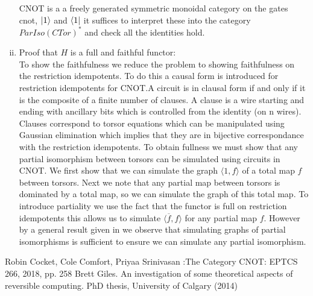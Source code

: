 \documentclass[11pt, oneside]{amsart}
\theoremstyle{definition}
\theoremstyle{definition}
\begin{document}
\begin{enumerate}[(i)]
\begin{figure}
         \label{fig:my_label}
     \end{figure}
     CNOT is a a freely generated symmetric monoidal category on the gates cnot, $\ket{1}$ and $\bra{1}$ it suffices to interpret these into the category $ParIso(CTor)^{*}$ and check all the identities hold.
     \item Proof that $H$ is a full and faithful functor:\\
     To show the faithfulness we reduce the problem to showing faithfulness on the restriction idempotents. To do this a causal form is introduced for restriction idempotents for CNOT.A circuit is in clausal form if and only if it is the composite of a finite
     number of clauses. A clause is a wire starting and ending with ancillary bits which is controlled
     from the identity (on n wires). Clauses correspond to torsor equations which can be manipulated using Gaussian elimination which implies that they are in bijective correspondance with the restriction idempotents. To obtain fullness we must show that any partial isomorphism between torsors can be simulated using circuits in CNOT. We first show that we can simulate the graph $\langle{1, f}\rangle$ of a total map $f$ between torsors. Next we note that any partial map between torsors is dominated by a total map, so we can simulate the graph of this total map. To introduce partiality we use the fact that the functor is full on restriction idempotents this allows us to simulate $\langle{\overline{f}, f}\rangle$ for any partial map $f$. However by a general result given in \cite{robin} we observe that simulating graphs of partial isomorphisms is sufficient to ensure we can simulate any partial isomorphism.
 \end{enumerate}
 

\begin{thebibliography}{10}
Robin Cocket, Cole Comfort, Priyaa Srinivasan :The Category CNOT: EPTCS 266, 2018, pp. 258
Brett Giles.
 An investigation of some theoretical aspects of reversible computing. PhD thesis, University of Calgary (2014)
\end{thebibliography}
\end{document}
